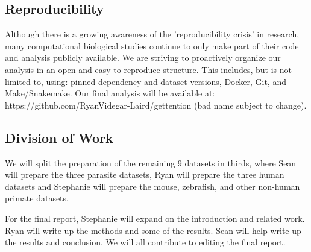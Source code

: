 \documentclass{article}
\begin{document}
\subsection{Reproducibility }

Although there is a growing awareness of the 'reproducibility  crisis' in research, many computational biological studies continue to only make part of their code and analysis publicly available. We are striving to proactively organize our analysis in an open and easy-to-reproduce structure. This includes, but is not limited to, using: pinned dependency and dataset versions, Docker, Git, and Make/Snakemake. Our final analysis will be available at: https://github.com/RyanVidegar-Laird/gettention (bad name subject to change).


\subsection{Division of Work}
We will split the preparation of the remaining 9 datasets in thirds, where Sean will prepare the three parasite datasets, Ryan will prepare the three human datasets and Stephanie will prepare the mouse, zebrafish, and other non-human primate datasets.

For the final report, Stephanie will expand on the introduction and related work. Ryan will write up the methods and some of the results. Sean will help write up the results and conclusion. We will all contribute to editing the final report.



\end{document}
